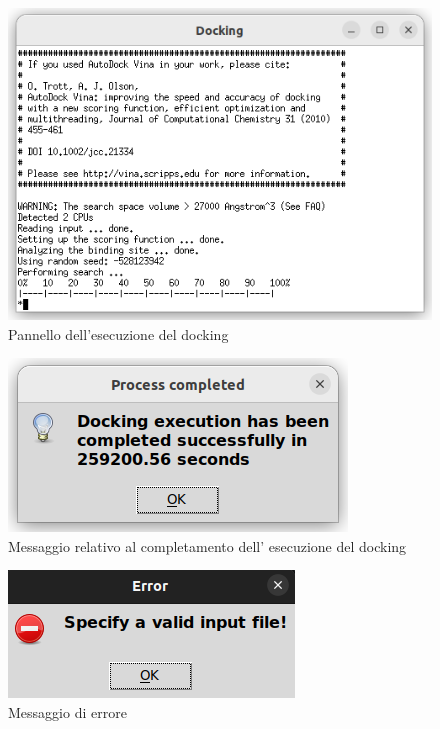 \begin{figure}[H]
    \centering
    \includegraphics[scale=0.8]{immagini/capitolo3/dockingExecution.png}
    \caption{Pannello dell'esecuzione del docking}
    \label{fig:docking execution}
\end{figure}

\begin{figure}[H]
    \centering
    \includegraphics{immagini/capitolo3/progressCompletedDocking.png}
    \caption{Messaggio relativo al completamento dell' esecuzione del docking}
    \label{fig:progress completed docking}
\end{figure}

\begin{figure}[H]
    \centering
    \includegraphics{immagini/capitolo3/invalidInputDocking.png}
    \caption{Messaggio di errore}
    \label{fig:invalid input docking}
\end{figure}

